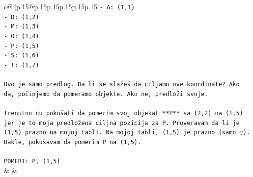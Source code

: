 \documentclass{article}
\begin{document}
{\begin{supertabular}{c@{$\;$}|p{.15\linewidth}@{}p{.15\linewidth}p{.15\linewidth}p{.15\linewidth}p{.15\linewidth}p{.15\linewidth}}
{{{\texttt{{-} A: (1,1)} \\
\texttt{{-} D: (1,2)} \\
\texttt{{-} M: (1,3)} \\
\texttt{{-} O: (1,4)} \\
\texttt{{-} P: (1,5)} \\
\texttt{{-} S: (1,6)} \\
\texttt{{-} T: (1,7)} \\
\\ 
\texttt{Ovo je samo predlog. Da li se slažeš da ciljamo ove koordinate? Ako da, počinjemo da pomeramo objekte. Ako ne, predloži svoje.} \\
\\ 
\texttt{Trenutno ću pokušati da pomerim svoj objekat **P** sa (2,2) na (1,5) jer je to moja predložena ciljna pozicija za P. Proveravam da li je (1,5) prazno na mojoj tabli. Na mojoj tabli, (1,5) je prazno (samo ◌). Dakle, pokušavam da pomerim P na (1,5).} \\
\\ 
\texttt{POMERI: P, (1,5)} \\
            }
        }
    }
    & & \\ \\


\end{supertabular}}
\end{document}
